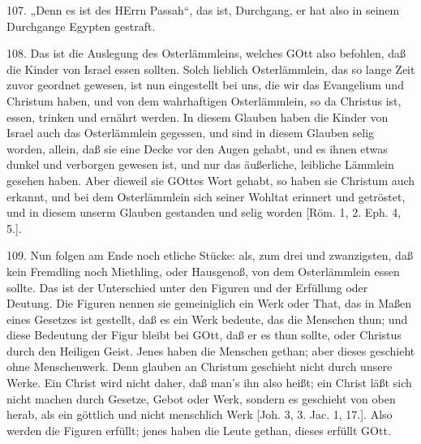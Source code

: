 107. „Denn es ist des HErrn Passah“, das ist, Durchgang, er hat also in seinem Durchgange Egypten gestraft.

108. Das ist die Auslegung des Osterlämmleins, welches GOtt also befohlen, daß die Kinder von Israel essen sollten. Solch lieblich Osterlämmlein, das so lange Zeit zuvor geordnet gewesen, ist nun eingestellt bei uns, die wir das Evangelium und Christum haben, und von dem wahrhaftigen Osterlämmlein, so da Christus ist, essen, trinken und ernährt werden. In diesem Glauben haben die Kinder von Israel auch das Osterlämmlein gegessen, und sind in diesem Glauben selig worden, allein, daß sie eine Decke vor den Augen gehabt, und es ihnen etwas dunkel und verborgen gewesen ist, und nur das äußerliche, leibliche Lämmlein gesehen haben. Aber dieweil sie GOttes Wort gehabt, so haben sie Christum auch erkannt, und bei dem Osterlämmlein sich seiner Wohltat erinnert und getröstet, und in diesem unserm Glauben gestanden und selig worden [Röm. 1, 2. Eph. 4, 5.].

109. Nun folgen am Ende noch etliche Stücke: als, zum drei und zwanzigsten, daß kein Fremdling noch Miethling, oder Hausgenoß, von dem Osterlämmlein essen sollte. Das ist der Unterschied unter den Figuren und der Erfüllung oder Deutung. Die Figuren nennen sie gemeiniglich ein Werk oder That, das in Maßen eines Gesetzes ist gestellt, daß es ein Werk bedeute, das die Menschen thun; und diese Bedeutung der Figur bleibt bei GOtt, daß er es thun sollte, oder Christus durch den Heiligen Geist. Jenes haben die Menschen gethan; aber dieses geschieht ohne Menschenwerk. Denn glauben an Christum geschieht nicht durch unsere Werke. Ein Christ wird nicht daher, daß man's ihn also heißt; ein Christ läßt sich nicht machen durch Gesetze, Gebot oder Werk, sondern es geschieht von oben herab, als ein göttlich und nicht menschlich Werk [Joh. 3, 3. Jac. 1, 17.]. Also werden die Figuren erfüllt; jenes haben die Leute gethan, dieses erfüllt GOtt.

